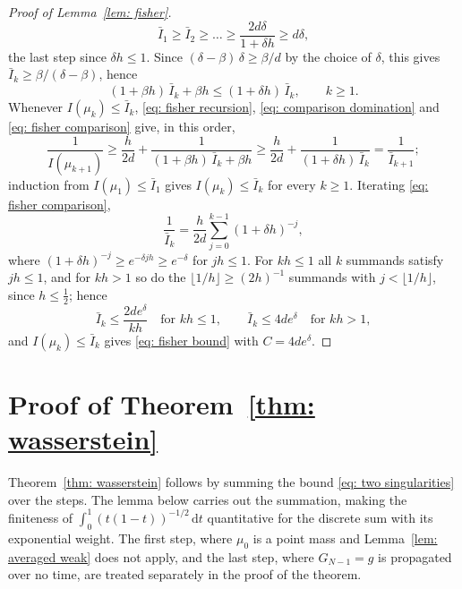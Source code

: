 \documentclass[namedate,webpdf,imanum]{ima-authoring-template}
\newcommand{\Le}{\leqslant}
\newcommand{\Ge}{\geqslant}
\newcommand{\D}{\mathrm{d}}
\theoremstyle{thmstyletwo}
\numberwithin{equation}{section}
\begin{document}
\begin{proof}[Proof of Lemma~\ref{lem: fisher}]
    \begin{equation*}
        \bar I_1 \Ge \bar I_2 \Ge \dots \Ge \frac{2 d \delta}{1 + \delta h} \Ge d \delta ,
    \end{equation*}
    the last step since $\delta h \Le 1$. Since $(\delta - \beta)\, \delta \Ge \beta / d$ by the choice of $\delta$, this gives $\bar I_k \Ge \beta / (\delta - \beta)$, hence
    \begin{equation}
        (1 + \beta h)\, \bar I_k + \beta h \Le (1 + \delta h)\, \bar I_k , \qquad k \Ge 1 .
        \label{eq: comparison domination}
    \end{equation}
    Whenever $I(\mu_k) \Le \bar I_k$, \eqref{eq: fisher recursion}, \eqref{eq: comparison domination} and \eqref{eq: fisher comparison} give, in this order,
    \begin{equation*}
        \frac{1}{I(\mu_{k+1})} \Ge \frac{h}{2d} + \frac{1}{(1 + \beta h)\, \bar I_k + \beta h} \Ge \frac{h}{2d} + \frac{1}{(1 + \delta h)\, \bar I_k} = \frac{1}{\bar I_{k+1}} ;
    \end{equation*}
    induction from $I(\mu_1) \Le \bar I_1$ gives $I(\mu_k) \Le \bar I_k$ for every $k \Ge 1$. Iterating \eqref{eq: fisher comparison},
    \begin{equation*}
        \frac{1}{\bar I_k} = \frac{h}{2d} \sum_{j=0}^{k-1} ( 1 + \delta h )^{-j} ,
    \end{equation*}
    where $( 1 + \delta h )^{-j} \Ge e^{-\delta j h} \Ge e^{-\delta}$ for $jh \Le 1$. For $kh \Le 1$ all $k$ summands satisfy $jh \Le 1$, and for $kh > 1$ so do the $\lfloor 1/h \rfloor \Ge (2h)^{-1}$ summands with $j < \lfloor 1/h \rfloor$, since $h \Le \frac12$; hence
    \begin{equation*}
        \bar I_k \Le \frac{2 d e^{\delta}}{k h} \quad \text{for } kh \Le 1 , \qquad
        \bar I_k \Le 4 d e^{\delta} \quad \text{for } kh > 1 ,
    \end{equation*}
    and $I(\mu_k) \Le \bar I_k$ gives \eqref{eq: fisher bound} with $C = 4 d e^{\delta}$.
\end{proof}

\section{Proof of Theorem~\ref{thm: wasserstein}}
\label{sec: wasserstein proof}

Theorem~\ref{thm: wasserstein} follows by summing the bound \eqref{eq: two singularities} over the steps. The lemma below carries out the summation, making the finiteness of $\int_0^1 (t(1-t))^{-1/2}\,\D t$ quantitative for the discrete sum with its exponential weight. The first step, where $\mu_0$ is a point mass and Lemma~\ref{lem: averaged weak} does not apply, and the last step, where $G_{N-1} = g$ is propagated over no time, are treated separately in the proof of the theorem.
\end{document}
